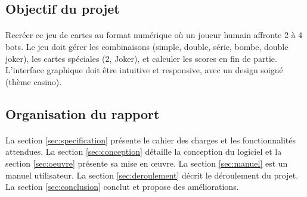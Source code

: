 \subsection{Objectif du projet}
\paragraph{} Recréer ce jeu de cartes au format numérique où un joueur humain affronte 2 à 4 bots. Le jeu doit gérer les combinaisons (simple, double, série, bombe, double joker), les cartes spéciales (2, Joker), et calculer les scores en fin de partie. L'interface graphique doit être intuitive et responsive, avec un design soigné (thème casino).

\subsection{Organisation du rapport}
\paragraph{} La section \ref{sec:specification} présente le cahier des charges et les fonctionnalités attendues. La section \ref{sec:conception} détaille la conception du logiciel et la section \ref{sec:oeuvre} présente sa mise en œuvre. La section \ref{sec:manuel} est un manuel utilisateur. La section \ref{sec:deroulement} décrit le déroulement du projet. La section \ref{sec:conclusion} conclut et propose des améliorations.
